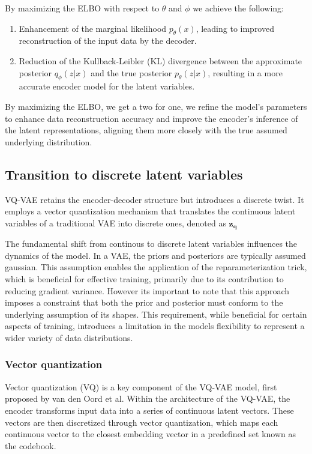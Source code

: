 By maximizing the ELBO with respect to \( \theta \) and \( \phi \) we achieve the following:

\begin{enumerate}
    \item Enhancement of the marginal likelihood \( p_\theta(x) \), leading to improved reconstruction of the input data by the decoder.
    \item Reduction of the Kullback-Leibler (KL) divergence between the approximate posterior \( q_\phi(z|x) \) and the true posterior \( p_\theta(z|x) \), resulting in a more accurate encoder model for the latent variables.
\end{enumerate}

By maximizing the ELBO, we get a two for one, we refine the model's parameters to enhance data reconstruction accuracy and improve the encoder's inference of the latent representations, aligning them more closely with the true assumed underlying distribution.\cite{VAE}
\subsection{Transition to discrete latent variables}
VQ-VAE retains the encoder-decoder structure but introduces a discrete twist. It employs a vector quantization mechanism that translates the continuous latent variables of a traditional VAE into discrete ones, denoted as $\mathbf{z_q}$

The fundamental shift from continous to discrete latent variables influences the dynamics of the model. In a VAE, the priors and posteriors are typically assumed gaussian. This assumption enables the application of the reparameterization trick\cite{1312.6114}, which is beneficial for effective training, primarily due to its contribution to
reducing gradient variance. However its important to note that this approach imposes a constraint that both the prior and posterior must conform to the underlying assumption of its shapes. This requirement, while beneficial for certain aspects of training, introduces a limitation in the models flexibility to represent a wider variety of data distributions.


\subsubsection{Vector quantization}
Vector quantization (VQ) is a key component of the VQ-VAE model, first proposed by van den Oord et al\cite{neuvqvae}. Within the architecture of the VQ-VAE, the encoder transforms input data into a series of continuous latent vectors. These vectors are then discretized through vector quantization,
which maps each continuous vector to the closest embedding vector in a predefined set known as the codebook.

